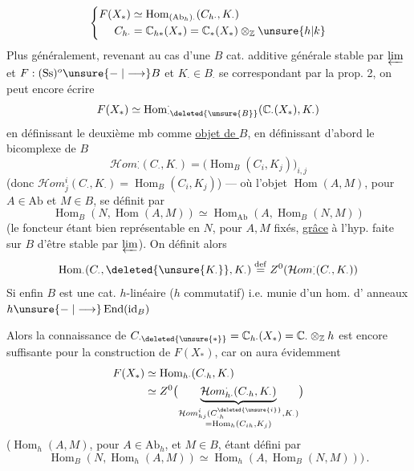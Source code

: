 \[
\left\{\begin{aligned}
F(X_*)&\simeq\operatorname{Hom}_{(\mathrm{Ab}_h)_\cdot}(C_{h\cdot},K_\cdot)\\
C_{h\cdot}&=\mathbb C_{h*}(X_*)=\mathbb C_*(X_*)\otimes_{\mathbb Z}\unsure{h|k}
\end{aligned}\right.
\]
Plus généralement, revenant au cas d'une
$B$ cat. additive générale stable par $\varprojlim$
et $F:(\mathrm{Ss})^o\unsure{\mathrel{-}|\longrightarrow}B$  et $K_\cdot\in B_\cdot$ se correspondant
par la prop. 2, on peut encore
écrire
\[
F(X_*)\simeq\operatorname{Hom}^{\cdot}_{\cdot\deleted{\unsure{B}}}(\mathbb C_\cdot(X_*),K_\cdot)
\]
en définissant le deuxième mb comme
\uline{objet de $B$}, en définissant d'abord le
bicomplexe de $B$
\[
\mathcal Hom^{\cdot}_{\cdot}(C_\cdot,K_\cdot)=
\bigl(\operatorname{Hom}_B(C_i,K_j)\bigr)_{i,j}
\]
(donc $\mathcal Hom^i_j(C_\cdot,K_\cdot)=\operatorname{Hom}_B(C_i,K_j)$)
--- où l'objet $\operatorname{Hom}(A,M)$, pour $A\in\mathrm{Ab}$
et $M\in B$, se définit par
\[
\operatorname{Hom}_B(N,\operatorname{Hom}(A,M))\simeq
\operatorname{Hom}_{\mathrm{Ab}}(A,\operatorname{Hom}_B(N,M))
\]
(le foncteur  étant bien
représentable en $N$, pour $A,M$ fixés, \uline{grâce}
à l'hyp. faite sur $B$ d'être stable par $\varprojlim$).
On définit alors
\[
\operatorname{Hom}_\cdot(C_\cdot,\deleted{\unsure{K_\cdot}},K_\cdot)
\overset{\mathrm{def}}=Z^0(\mathcal Hom^{\cdot}_{\cdot}(C_\cdot,K_\cdot))
\]
Si enfin $B$ est une cat. $h$-linéaire
($h$ commutatif) i.e. munie d'un hom. d'
anneaux $h\unsure{\mathrel{-}|\longrightarrow}\operatorname{End}(\mathrm{id}_B)$

Alors la connaissance de $C_{\cdot\deleted{\unsure{*}}}=\mathbb C_{h\cdot}(X_*)
=\mathbb C_\cdot\otimes_{\mathbb Z}h$ est encore suffisante pour
la construction de $F(X_*)$, car on aura
évidemment
\[
\begin{aligned}
F(X_*)&\simeq\operatorname{Hom}_{h\cdot}(C_{\cdot h},K_\cdot)\\
&\simeq Z^0\bigl(\underbrace{\mathcal Hom^{\cdot}_{h\cdot}(C_{\cdot h},K_\cdot)}_{
\substack{\mathcal Hom^i_{hj}(C_{\cdot h}^{\deleted{\unsure{i}}},K_\cdot)\\
=\operatorname{Hom}_h(C_{ih},K_j)}}\bigr)
\end{aligned}
\]
($\operatorname{Hom}_h(A,M)$, pour $A\in\mathrm{Ab}_h$, et $M\in B$, étant
défini par
\[
\operatorname{Hom}_B(N,\operatorname{Hom}_h(A,M))\simeq
\operatorname{Hom}_h(A,\operatorname{Hom}_B(N,M)))\,.
\]

